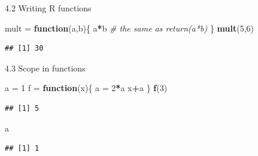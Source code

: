 \documentclass[
  ignorenonframetext,
]{beamer}
\newenvironment{Shaded}{\begin{snugshade}}{\end{snugshade}}
\newcommand{\CommentTok}[1]{\textcolor[rgb]{0.56,0.35,0.01}{\textit{#1}}}
\newcommand{\ControlFlowTok}[1]{\textcolor[rgb]{0.13,0.29,0.53}{\textbf{#1}}}
\newcommand{\DecValTok}[1]{\textcolor[rgb]{0.00,0.00,0.81}{#1}}
\newcommand{\FunctionTok}[1]{\textcolor[rgb]{0.13,0.29,0.53}{\textbf{#1}}}
\newcommand{\NormalTok}[1]{#1}
\newcommand{\OtherTok}[1]{\textcolor[rgb]{0.56,0.35,0.01}{#1}}
\newcommand{\SpecialCharTok}[1]{\textcolor[rgb]{0.81,0.36,0.00}{\textbf{#1}}}
\begin{document}
\begin{frame}[fragile]{4.2 Writing R functions}
\protect\hypertarget{writing-r-functions}{}
\begin{Shaded}
\begin{Highlighting}[]
\NormalTok{mult }\OtherTok{=} \ControlFlowTok{function}\NormalTok{(a,b)\{}
\NormalTok{  a}\SpecialCharTok{*}\NormalTok{b }\CommentTok{\# the same as return(a*b)}
\NormalTok{\}}
\FunctionTok{mult}\NormalTok{(}\DecValTok{5}\NormalTok{,}\DecValTok{6}\NormalTok{)}
\end{Highlighting}
\end{Shaded}

\begin{verbatim}
## [1] 30
\end{verbatim}
\end{frame}

\begin{frame}[fragile]{4.3 Scope in functions}
\protect\hypertarget{scope-in-functions}{}
\begin{Shaded}
\begin{Highlighting}[]
\NormalTok{a }\OtherTok{=} \DecValTok{1}
\NormalTok{f }\OtherTok{=} \ControlFlowTok{function}\NormalTok{(x)\{}
\NormalTok{  a }\OtherTok{=} \DecValTok{2}\SpecialCharTok{*}\NormalTok{a}
\NormalTok{  x}\SpecialCharTok{+}\NormalTok{a}
\NormalTok{\}}
\FunctionTok{f}\NormalTok{(}\DecValTok{3}\NormalTok{)}
\end{Highlighting}
\end{Shaded}

\begin{verbatim}
## [1] 5
\end{verbatim}

\begin{Shaded}
\begin{Highlighting}[]
\NormalTok{a}
\end{Highlighting}
\end{Shaded}

\begin{verbatim}
## [1] 1
\end{verbatim}
\end{frame}
\end{document}
